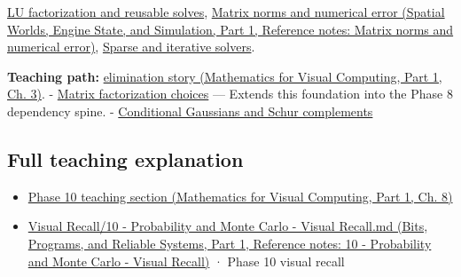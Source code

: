 \hypertarget{appendix-f6e77f4a200f-used-by}{}

\hyperref[appendix-55e4b5b0a1e6]{LU factorization and reusable solves}, \href{../05-Spatial-Worlds-Engine-State-and-Simulation-P01/main.pdf\#appendix-f8657bac66e5}{Matrix norms and numerical error (Spatial Worlds, Engine State, and Simulation, Part 1, Reference notes: Matrix norms and numerical error)}, \hyperref[appendix-67c87a3d9e94]{Sparse and iterative solvers}.

\textbf{Teaching path:} \href{../02-Mathematics-for-Visual-Computing-P01/main.pdf\#01-foundations-i-ch019-elimination-turns-the-geometry-into-an-auditable-calculation}{elimination story (Mathematics for Visual Computing, Part 1, Ch. 3)}. - \hyperref[appendix-221a483bec2d]{Matrix factorization choices} --- Extends this foundation into the Phase 8 dependency spine. - \hyperref[appendix-f0437ea55a47]{Conditional Gaussians and Schur complements}

\subsection{Full teaching explanation}\label{appendix-f6e77f4a200f-full-teaching-explanation}

\hypertarget{appendix-f6e77f4a200f-full-teaching-explanation}{}

\begin{itemize}
\tightlist
\item
  \href{../02-Mathematics-for-Visual-Computing-P01/main.pdf\#02-foundations-ii-ch024-waiting-times-event-counts-and-covariance-geometry}{Phase 10 teaching section (Mathematics for Visual Computing, Part 1, Ch. 8)}
\item
  \href{../01-Bits-Programs-and-Reliable-Systems-P01/main.pdf\#appendix-cb5af353ef77}{Visual Recall/10 - Probability and Monte Carlo - Visual Recall.md (Bits, Programs, and Reliable Systems, Part 1, Reference notes: 10 - Probability and Monte Carlo - Visual Recall)} · Phase 10 visual recall
\end{itemize}
